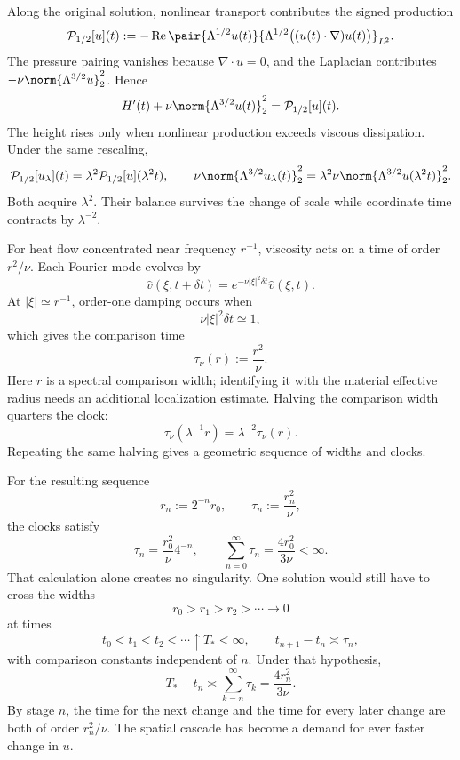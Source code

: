 Along the original solution, nonlinear transport contributes the signed production
\[
  \mathcal P_{1/2}[u](t)
  :=
  -\operatorname{Re}
  \pair
    {\Lambda^{1/2}u(t)}
    {\Lambda^{1/2}\bigl((u(t)\cdot\nabla)u(t)\bigr)}_{L^2}.
\]
The pressure pairing vanishes because \(\nabla\cdot u=0\), and the Laplacian contributes \(-\nu\norm{\Lambda^{3/2}u}_2^2\). Hence
\[
  H'(t)
  +
  \nu\norm{\Lambda^{3/2}u(t)}_2^2
  =
  \mathcal P_{1/2}[u](t).
\]
The height rises only when nonlinear production exceeds viscous dissipation. Under the same rescaling,
\[
  \mathcal P_{1/2}[u_\lambda](t)
  =
  \lambda^2\mathcal P_{1/2}[u](\lambda^2t),
  \qquad
  \nu\norm{\Lambda^{3/2}u_\lambda(t)}_2^2
  =
  \lambda^2\nu\norm{\Lambda^{3/2}u(\lambda^2t)}_2^2.
\]
Both acquire \(\lambda^2\). Their balance survives the change of scale while coordinate time contracts by \(\lambda^{-2}\).


For heat flow concentrated near frequency \(r^{-1}\), viscosity acts on a time of order \(r^2/\nu\). Each Fourier mode evolves by
\[
  \widehat v(\xi,t+\delta t)
  =
  e^{-\nu|\xi|^2\delta t}\widehat v(\xi,t).
\]
At \(|\xi|\simeq r^{-1}\), order-one damping occurs when
\[
  \nu|\xi|^2\delta t\simeq1,
\]
which gives the comparison time
\[
  \tau_\nu(r)
  :=
  \frac{r^2}{\nu}.
\]
Here \(r\) is a spectral comparison width; identifying it with the material effective radius needs an additional localization estimate. Halving the comparison width quarters the clock:
\[
  \tau_\nu(\lambda^{-1}r)
  =
  \lambda^{-2}\tau_\nu(r).
\]
Repeating the same halving gives a geometric sequence of widths and clocks.


For the resulting sequence
\[
  r_n:=2^{-n}r_0,
  \qquad
  \tau_n:=\frac{r_n^2}{\nu},
\]
the clocks satisfy
\[
  \tau_n
  =
  \frac{r_0^2}{\nu}4^{-n},
  \qquad
  \sum_{n=0}^{\infty}\tau_n
  =
  \frac{4r_0^2}{3\nu}
  <
  \infty.
\]
That calculation alone creates no singularity. One \NavierStokes{} solution would still have to cross the widths
\[
  r_0>r_1>r_2>\cdots\longrightarrow0
\]
at times
\[
  t_0<t_1<t_2<\cdots\uparrow T_*<\infty,
  \qquad
  t_{n+1}-t_n\asymp\tau_n,
\]
with comparison constants independent of \(n\). Under that hypothesis,
\[
  T_*-t_n
  \asymp
  \sum_{k=n}^{\infty}\tau_k
  =
  \frac{4r_n^2}{3\nu}.
\]
By stage \(n\), the time for the next change and the time for every later change are both of order \(r_n^2/\nu\). The spatial cascade has become a demand for ever faster change in \(u\).
